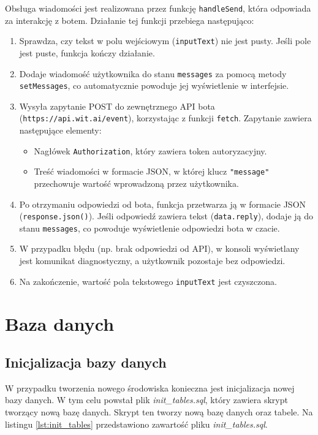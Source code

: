 Obsługa wiadomości jest realizowana przez funkcję \texttt{handleSend}, która odpowiada za interakcję z botem. Działanie tej funkcji przebiega następująco: \begin{enumerate} \item Sprawdza, czy tekst w polu wejściowym (\texttt{inputText}) nie jest pusty. Jeśli pole jest puste, funkcja kończy działanie. \item Dodaje wiadomość użytkownika do stanu \texttt{messages} za pomocą metody \texttt{setMessages}, co automatycznie powoduje jej wyświetlenie w interfejsie. \item Wysyła zapytanie POST do zewnętrznego API bota (\texttt{https://api.wit.ai/event}), korzystając z funkcji \texttt{fetch}. Zapytanie zawiera następujące elementy: \begin{itemize} \item Nagłówek \texttt{Authorization}, który zawiera token autoryzacyjny. \item Treść wiadomości w formacie JSON, w której klucz \texttt{"message"} przechowuje wartość wprowadzoną przez użytkownika. \end{itemize} \item Po otrzymaniu odpowiedzi od bota, funkcja przetwarza ją w formacie JSON (\texttt{response.json()}). Jeśli odpowiedź zawiera tekst (\texttt{data.reply}), dodaje ją do stanu \texttt{messages}, co powoduje wyświetlenie odpowiedzi bota w czacie. \item W przypadku błędu (np. brak odpowiedzi od API), w konsoli wyświetlany jest komunikat diagnostyczny, a użytkownik pozostaje bez odpowiedzi. \item Na zakończenie, wartość pola tekstowego \texttt{inputText} jest czyszczona. \end{enumerate}

\section{Baza danych}

\subsection{Inicjalizacja bazy danych}

W przypadku tworzenia nowego środowiska konieczna jest inicjalizacja nowej bazy danych. W tym celu powstał plik \textit{init\_tables.sql}, który zawiera skrypt tworzący nową bazę danych. Skrypt ten tworzy nową bazę danych oraz tabele. Na listingu \ref{lst:init_tables} przedstawiono zawartość pliku \textit{init\_tables.sql}.

